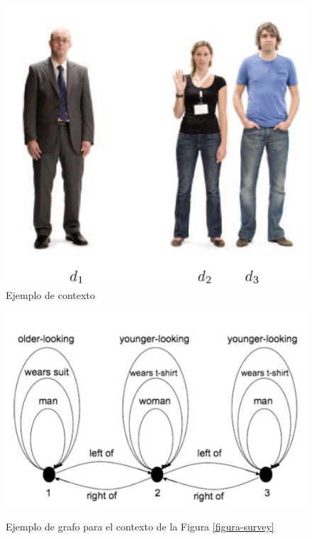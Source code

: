 \begin{figure}[!ht]
\begin{minipage}[t]{0.4\linewidth}
\centering
\includegraphics[width=\textwidth]{images/contexto-survey.png}\\[0pt]
\caption{Ejemplo de contexto}
\label{figura-survey}
\vspace*{.1cm}
\end{minipage}
\hspace*{0cm}
\begin{minipage}[t]{0.6\linewidth}
\centering
\includegraphics[width=\textwidth]{images/grafo-survey.png}\\[0pt]
\caption{Ejemplo de grafo para el contexto de la Figura \ref{figura-survey}}
\label{grafo-survey}
\end{minipage}
\end{figure}



